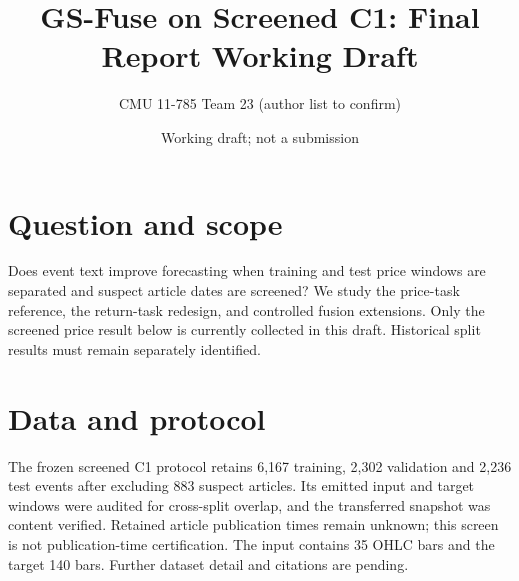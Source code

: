 \documentclass[11pt]{article}
\title{GS-Fuse on Screened C1: Final Report Working Draft}
\author{CMU 11-785 Team 23 \quad (author list to confirm)}
\date{Working draft; not a submission}
\begin{document}
\maketitle
\section{Question and scope}
Does event text improve forecasting when training and test price windows are
separated and suspect article dates are screened? We study the price-task
reference, the return-task redesign, and controlled fusion extensions.
Only the screened price result below is currently collected in this draft.
Historical split results must remain separately identified.
\section{Data and protocol}
The frozen screened C1 protocol retains 6,167 training, 2,302 validation and
2,236 test events after excluding 883 suspect articles. Its emitted input and
target windows were audited for cross-split overlap, and the transferred snapshot
was content verified. Retained article publication times remain unknown; this
screen is not publication-time certification. The input contains 35 OHLC bars
and the target 140 bars. Further dataset detail and citations are pending.
\end{document}
